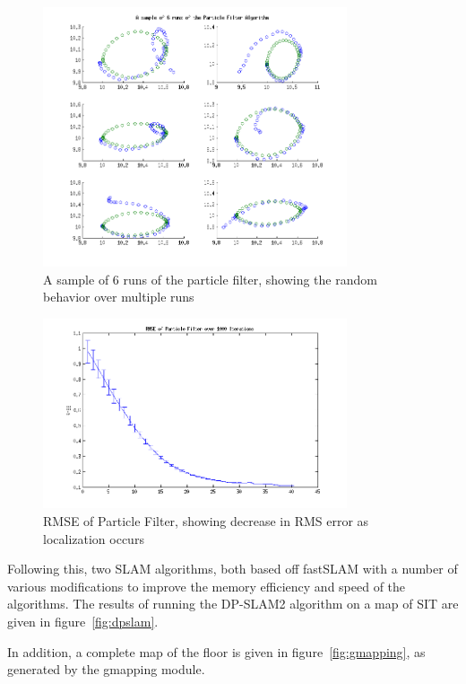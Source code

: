 \documentclass[english]{article}
\begin{document}
\begin{figure}[htp]
\centering
 \includegraphics[width=0.8\textwidth]{images/particlefilter.png}
\caption{A sample of 6 runs of the particle filter, showing the random behavior over multiple runs}
\label{fig:particle}
\end{figure}

\begin{figure}[htp]
\centering
 \includegraphics[width=0.8\textwidth]{images/particlefilterRMSE.png}
\caption{RMSE of Particle Filter, showing decrease in RMS error as localization occurs}
\label{fig:rmseparticle}
\end{figure}

Following this, two SLAM algorithms, both based off fastSLAM with a number of various modifications to improve the memory efficiency and speed of the algorithms. The results of running the DP-SLAM2 algorithm on a map of SIT are given in figure~\ref{fig:dpslam}.

In addition, a complete map of the floor is given in figure~\ref{fig:gmapping}, as generated by the gmapping module.
\end{document}
